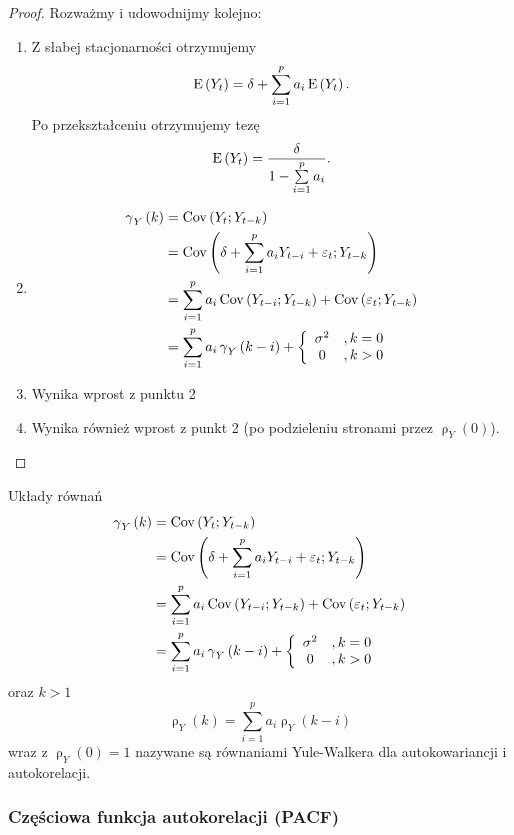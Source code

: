 \documentclass[10pt,a4paper]{book}
\newcommand{\tsAutoCovariance}[3][\gamma]{\operatorname{#1}_{#2} \left({#3}\right)}
\newcommand{\tsAutoCorellation}[3][\rho]{\operatorname{#1}_{#2} \left({#3}\right)}
\begin{document}
\begin{proof}
Rozważmy i udowodnijmy kolejno:
\begin{enumerate}
\item Z słabej stacjonarności otrzymujemy
$$
\Ex{Y_t} = \delta + \sum_{i=1}^{p} a_i \Ex{Y_t}.
$$
Po przekształceniu otrzymujemy tezę
$$
\Ex{Y_t} = \frac{\delta}{1	- \sum_{i=1}^{p} a_i}.
$$
\item 
\begin{align*}
\tsAutoCovariance{Y}{k} &= \Covariance{Y_t}{Y_{t-k}} \\
&= \Covariance{\delta + \sum_{i=1}^{p} a_i Y_{t-i} + \epsilon_t}{Y_{t-k}} \\
&= \sum_{i=1}^{p} a_i \Covariance{Y_{t-i}}{Y_{t-k}} + \Covariance{\epsilon_t}{Y_{t-k}} \\
&= \sum_{i=1}^{p} a_i \tsAutoCovariance{Y}{k-i} + \left \lbrace \begin{array}{c l}
\sigma^2&, k=0 \\
0&, k > 0
\end{array} \right.
\end{align*}
\item Wynika wprost z punktu 2
\item Wynika również wprost z punkt 2 (po podzieleniu stronami przez $\tsAutoCorellation{Y}{0}$).
\end{enumerate}
\end{proof}

\begin{remark}
Układy równań 
\begin{align*}
\tsAutoCovariance{Y}{k} &= \Covariance{Y_t}{Y_{t-k}} \\
&= \Covariance{\delta + \sum_{i=1}^{p} a_i Y_{t-i} + \epsilon_t}{Y_{t-k}} \\
&= \sum_{i=1}^{p} a_i \Covariance{Y_{t-i}}{Y_{t-k}} + \Covariance{\epsilon_t}{Y_{t-k}} \\
&= \sum_{i=1}^{p} a_i \tsAutoCovariance{Y}{k-i} + \left \lbrace \begin{array}{c l}
\sigma^2&, k=0 \\
0&, k > 0
\end{array} \right.
\end{align*}
oraz $k>1$
$$
\tsAutoCorellation{Y}{k} = \sum_{i=1}^{p} a_i \tsAutoCorellation{Y}{k-i}
$$ 
wraz z $\tsAutoCorellation{Y}{0} = 1$ nazywane są równaniami Yule-Walkera dla autokowariancji i autokorelacji.

\end{remark}

\subsubsection{Częściowa funkcja autokorelacji (PACF)}
\end{document}
